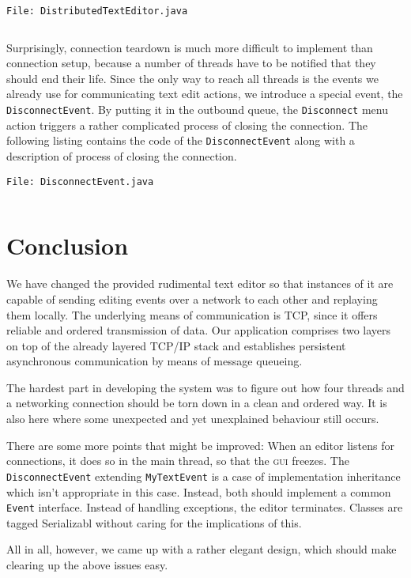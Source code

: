 \documentclass[a4paper,draft,12pt,oneside,article,table]{memoir}
\newcommand{\srcpath}{../ex09/src/main/java/ddist}
\newcommand{\inmnt}[3]{\noindent\texttt{\color{gray}File: #3}\vspace{-1em}\inputminted[tabsize=4,firstline=#1,firstnumber=#1,lastline=#2,linenos]{java}{\srcpath/#3}}
\newcommand{\mil}[1]{\texttt{#1}}
\begin{document}
\inmnt{230}{240}{DistributedTextEditor.java}

Surprisingly, connection teardown is much more difficult to implement
than connection setup, because a number of threads have to be notified
that they should end their life. Since the only way to reach all threads
is the events we already use for communicating text edit actions, we
introduce a special event, the \mil{DisconnectEvent}. By putting it in
the outbound queue, the \mil{Disconnect} menu action triggers a rather
complicated process of closing the connection. The following listing
contains the code of the \mil{DisconnectEvent} along with a description
of process of closing the connection.

\inmnt{1}{1000}{DisconnectEvent.java}


\chapter{Conclusion}

We have changed the provided rudimental text editor so that instances of
it are capable of sending editing events over a network to each other
and replaying them locally. The underlying means of communication is
TCP, since it offers reliable and ordered transmission of data. Our
application comprises two layers on top of the already layered TCP/IP
stack and establishes persistent asynchronous communication by means of
message queueing.

The hardest part in developing the system was to figure out how four
threads and a networking connection should be torn down in a clean and
ordered way. It is also here where some unexpected and yet unexplained
behaviour still occurs.

There are some more points that might be improved: When an editor
listens for connections, it does so in the main thread, so that the
\textsc{gui} freezes. The \mil{DisconnectEvent} extending
\mil{MyTextEvent} is a case of implementation inheritance which isn't
appropriate in this case. Instead, both should implement a common
\mil{Event} interface. Instead of handling exceptions, the editor
terminates. Classes are tagged Serializabl without caring for the
implications of this.

All in all, however, we came up with a rather elegant design, which
should make clearing up the above issues easy.

\end{document}
